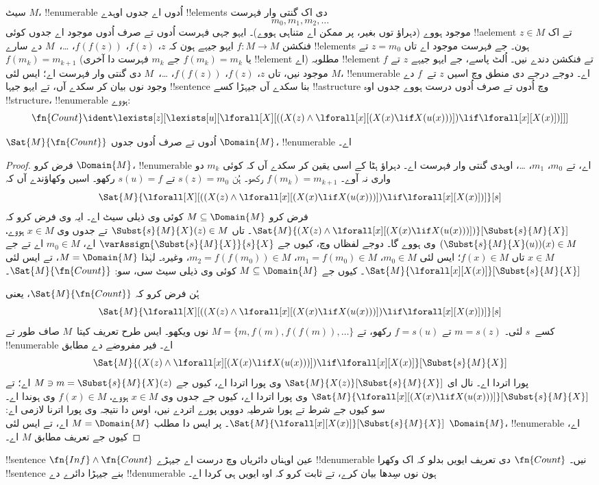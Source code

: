 \documentclass[../../../include/open-logic-section]{subfiles}
\begin{document}
سیٹ $M$، !!{enumerable}
اُدوں اے جدوں اوہدے !!{element}s دی اک گنتی وار فہرست
\[
m_0, m_1, m_2, \dots
\]
موجود ہووے (دہراؤ توں بغیر، پر ممکن اے متناہی ہووے)۔ ایہو جہی
فہرست اُدوں تے صرف اُدوں موجود اے جدوں کوئی !!a{element}
$z \in M$ تے اک فنکشن $f\colon M \to M$ ایہو جیہے ہون کہ
$z$، $f(z)$، $f(f(z))$، \dots،~$M$ دے سارے !!{element}s
ہون۔ جے فہرست موجود اے تاں $z = m_0$ تے
$f(m_k) = m_{k+1}$ (یا $f(m_k) = m_k$ جے $m_k$ فہرست دا آخری
!!{element} اے) مطلوبہ !!{element} تے فنکشن دندے نیں۔
اُلٹ پاسے، جے ایہو جیہے $z$ تے $f$ موجود نیں، تاں
$z$، $f(z)$، $f(f(z))$، \dots،~$M$ دی گنتی وار فہرست اے؛
ایس لئی $M$، !!{enumerable} اے۔ دوجے درجے دی منطق وچ اسیں
$z$ تے~$f$ دے وجود نوں بیان کر سکدے آں، تے ایہو جیہا
!!{sentence} بنا سکدے آں جیہڑا کسے !!a{structure} وچ اُدوں
تے صرف اُدوں درست ہووے جدوں اوہ !!{structure}، !!{enumerable} ہووے:
\[
\fn{Count} \ident
\lexists[z][\lexists[u][\lforall[X][((X(z) \land
      \lforall[x][(X(x) \lif X(u(x)))]) \lif \lforall[x][X(x)])]]]
\]

\begin{prop}
$\Sat{M}{\fn{Count}}$ اُدوں تے صرف اُدوں جدوں $\Domain{M}$،
!!{enumerable} اے۔
\end{prop}

\begin{proof}
فرض کرو $\Domain{M}$، !!{enumerable} اے، تے $m_0$، $m_1$،
\dots، اوہدی گنتی وار فہرست اے۔ دہراؤ ہٹا کے اسی یقین
کر سکدے آں کہ کوئی $m_k$ دو واری
نہ آوے۔ $f(m_k) = m_{k+1}$ رکھو۔ ہُن
$s(z) = m_0$ تے $s(u) = f$ رکھو۔ اسیں وکھاؤندے آں کہ
\[
\Sat{M}{\lforall[X][((X(z) \land \lforall[x][(X(x) \lif X(u(x)))])
    \lif \lforall[x][X(x)])]}[s]
\]
فرض کرو $M \subseteq \Domain{M}$ کوئی وی ذیلی سیٹ اے۔ ایہ وی فرض کرو کہ
$\Sat{M}{(X(z) \land \lforall[x][(X(x) \lif
X(u(x)))])}[\Subst{s}{M}{X}]$۔ تاں $\Subst{s}{M}{X}(z) \in M$
تے جدوں وی $x \in M$ ہووے، $(\Subst{s}{M}{X}(u))(x) \in M$
وی ہووے گا۔ دوجے لفظاں وچ، کیوں جے
$\varAssign{\Subst{s}{M}{X}}{s}{X}$ اے، $m_0 \in M$ اے
تے جے $x \in M$ تاں $f(x) \in M$؛ ایس لئی
$m_0 \in M$، $m_1 = f(m_0) \in M$،
$m_2 = f(f(m_0)) \in M$، وغیرہ۔ لہٰذا $M = \Domain{M}$،
تے ایس لئی
$\Sat{M}{\lforall[x][X(x)]}[\Subst{s}{M}{X}]$۔ کیوں جے
$M \subseteq
\Domain{M}$ کوئی وی ذیلی سیٹ سی، سو:
$\Sat{M}{\fn{Count}}$۔

ہُن فرض کرو کہ $\Sat{M}{\fn{Count}}$، یعنی
\[
\Sat{M}{\lforall[X][((X(z) \land \lforall[x][(X(x) \lif X(u(x)))])
    \lif \lforall[x][X(x)])]}[s]
\]
کسے~$s$ لئی۔ $m = s(z)$ تے $f = s(u)$ رکھو، تے
$M = \{m,
f(m), f(f(m)), \dots\}$ نوں ویکھو۔ ایس طرح تعریف
کیتا~$M$ صاف طور تے !!{enumerable} اے۔ فیر مفروضے دے مطابق
\[
\Sat{M}{(X(z) \land \lforall[x][(X(x) \lif X(u(x)))])
    \lif \lforall[x][X(x)]}[\Subst{s}{M}{X}]
\]
پورا اتردا اے۔ نال ای $\Sat{M}{X(z)}[\Subst{s}{M}{X}]$ وی
پورا اتردا اے، کیوں جے $M \ni m =
\Subst{s}{M}{X}(z)$ اے؛ تے
$\Sat{M}{\lforall[x][(X(x) \lif
X(u(x)))]}[\Subst{s}{M}{X}]$ وی پورا اتردا اے، کیوں جے
جدوں وی $x \in M$ ہووے، $f(x) \in
M$ وی ہوندا اے۔ سو کیوں جے شرط تے پورا شرطیہ دوویں پورے اتردے نیں، اوس دا
نتیجہ وی پورا اترنا لازمی اے:
$\Sat{M}{\lforall[x][X(x)]}[\Subst{s}{M}{X}]$۔ پر ایس
دا مطلب $M = \Domain{M}$ اے، تے ایس لئی $\Domain{M}$،
!!{enumerable} اے، کیوں جے تعریف مطابق $M$ اے۔
\end{proof}

\begin{prob}
!!{sentence} $\fn{Inf} \land \fn{Count}$ عین اوہناں دائریاں وچ
درست اے جیہڑے !!{denumerable} نیں۔ $\fn{Count}$ دی تعریف
ایویں بدلو کہ اک وکھرا !!{sentence} بنے جیہڑا دائرے دے
!!{denumerable} ہون نوں سِدھا بیان کرے، تے ثابت کرو کہ اوہ
ایویں ہی کردا اے۔
\end{prob}
\end{document}
